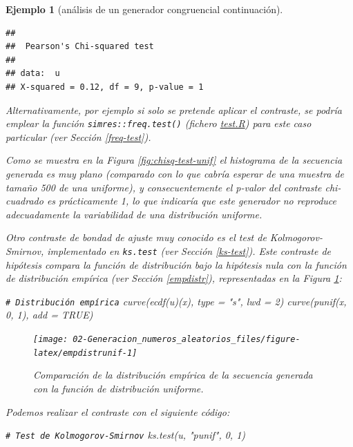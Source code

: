 \documentclass[
]{book}
\newenvironment{Shaded}{\begin{snugshade}}{\end{snugshade}}
\newcommand{\AttributeTok}[1]{\textcolor[rgb]{0.77,0.63,0.00}{#1}}
\newcommand{\CommentTok}[1]{\textcolor[rgb]{0.56,0.35,0.01}{\textit{#1}}}
\newcommand{\ConstantTok}[1]{\textcolor[rgb]{0.00,0.00,0.00}{#1}}
\newcommand{\DecValTok}[1]{\textcolor[rgb]{0.00,0.00,0.81}{#1}}
\newcommand{\FunctionTok}[1]{\textcolor[rgb]{0.00,0.00,0.00}{#1}}
\newcommand{\NormalTok}[1]{#1}
\newcommand{\StringTok}[1]{\textcolor[rgb]{0.31,0.60,0.02}{#1}}
\theoremstyle{break}
\newtheorem{example}{Ejemplo}[chapter]
\theoremstyle{nonumberplain}
\renewcommand{\CommentTok}[1]{\textcolor[rgb]{0.41,0.41,0.41}{\texttt{#1}}}
\begin{document}
\begin{example}[análisis de un generador congruencial continuación]
\begin{verbatim}
## 
##  Pearson's Chi-squared test
## 
## data:  u
## X-squared = 0.12, df = 9, p-value = 1
\end{verbatim}

Alternativamente, por ejemplo si solo se pretende aplicar el contraste, se podría emplear la función \texttt{simres::freq.test()} (fichero \href{R/test.R}{\emph{test.R}}) para este caso particular (ver Sección \ref{freq-test}).

Como se muestra en la Figura \ref{fig:chisq-test-unif} el histograma de la secuencia generada es muy plano (comparado con lo que cabría esperar de una muestra de tamaño 500 de una uniforme), y consecuentemente el p-valor del contraste chi-cuadrado es prácticamente 1, lo que indicaría que este generador no reproduce adecuadamente la variabilidad de una distribución uniforme.

Otro contraste de bondad de ajuste muy conocido es el test de Kolmogorov-Smirnov, implementado en \texttt{ks.test} (ver Sección \ref{ks-test}).
Este contraste de hipótesis compara la función de distribución bajo la hipótesis nula con la función de distribución empírica (ver Sección \ref{empdistr}), representadas en la Figura \ref{fig:empdistrunif}:

\begin{Shaded}
\begin{Highlighting}[]
\CommentTok{\# Distribución empírica}
\FunctionTok{curve}\NormalTok{(}\FunctionTok{ecdf}\NormalTok{(u)(x), }\AttributeTok{type =} \StringTok{"s"}\NormalTok{, }\AttributeTok{lwd =} \DecValTok{2}\NormalTok{)}
\FunctionTok{curve}\NormalTok{(}\FunctionTok{punif}\NormalTok{(x, }\DecValTok{0}\NormalTok{, }\DecValTok{1}\NormalTok{), }\AttributeTok{add =} \ConstantTok{TRUE}\NormalTok{)}
\end{Highlighting}
\end{Shaded}

\begin{figure}[!htb]

{\centering \texttt{[image: 02-Generacion\_numeros\_aleatorios\_files/figure-latex/empdistrunif-1]} 

}

\caption{Comparación de la distribución empírica de la secuencia generada con la función de distribución uniforme.}\label{fig:empdistrunif}
\end{figure}

Podemos realizar el contraste con el siguiente código:

\begin{Shaded}
\begin{Highlighting}[]
\CommentTok{\# Test de Kolmogorov{-}Smirnov}
\FunctionTok{ks.test}\NormalTok{(u, }\StringTok{"punif"}\NormalTok{, }\DecValTok{0}\NormalTok{, }\DecValTok{1}\NormalTok{)}
\end{Highlighting}
\end{Shaded}


\end{example}
\end{document}
